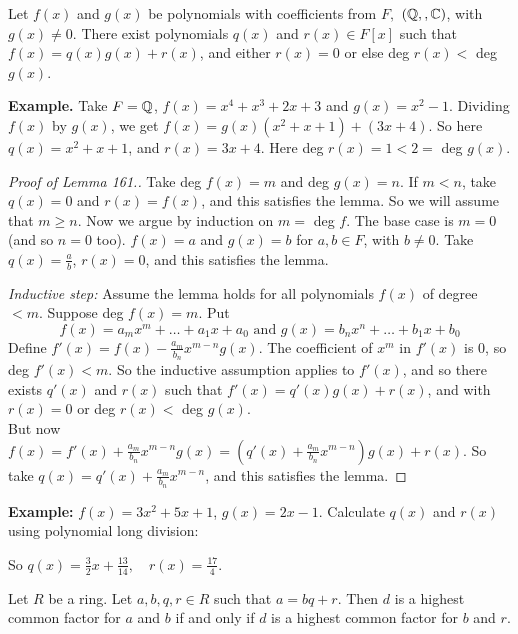 \documentclass[10pt]{scrartcl}
\begin{document}
\begin{lemma} Let $f(x)$ and $g(x)$ be polynomials with coefficients from $F,$ $(\mathbb{Q},,\mathbb{C})$, with $g(x) \neq 0$. There exist polynomials $q(x)$ and $r(x) \in F[x]$ such that $f(x) = q(x)g(x) + r(x)$, and either $r(x) =0$ or else deg $r(x) <$ deg $g(x)$. 	
\end{lemma}

 \textbf{Example.} Take $F = \mathbb{Q}$, $f(x) = x^4 + x^3 + 2x + 3$ and $g(x) = x^2 -1$. Dividing $f(x)$ by $g(x)$, we get $f(x) = g(x)(x^2 + x + 1) + (3x+4)$. So here $q(x) = x^2 + x + 1$, and $r(x) = 3x + 4$. Here deg $r(x) = 1 < 2 = $ deg $g(x)$.

\begin{proof}[Proof of Lemma 161.]
	Take deg $f(x) = m$ and deg $g(x) = n$. If $m < n$, take $q(x) =0$ and $r(x) = f(x)$, and this satisfies the lemma. So we will assume that $m \geq n$. Now we argue by induction on $m = $ deg $f$. The base case is $m = 0$ (and so $n = 0$ too). $f(x) = a$ and $g(x) = b$ for $a,b \in F$, with $b \neq 0$. Take $q(x) = \frac{a}{b}$, $r(x) = 0$, and this satisfies the lemma.
	
	\textit{Inductive step:} Assume the lemma holds for all polynomials $f(x)$ of degree $<m$. Suppose deg $f(x) = m$. Put \[f(x) = a_mx^m + \dots + a_1x + a_0 \text{ and } g(x) = b_nx^n + \dots + b_1x + b_0\] Define $f'(x) = f(x) - \frac{a_m}{b_n}x^{m-n}g(x)$. The coefficient of $x^m$ in $f'(x)$ is $0$, so deg $f'(x) < m$. So the inductive assumption applies to $f'(x)$, and so there exists $q'(x)$ and $r(x)$ such that $f'(x) = q'(x)g(x) + r(x)$, and with $r(x) = 0$ or deg $r(x) <$ deg $g(x)$.\vspace*{5pt}\\ But now $f(x) = f'(x) + \frac{a_m}{b_n}x^{m-n}g(x) = (q'(x) + \frac{a_m}{b_n}x^{m-n})g(x) + r(x).$ So take $q(x) = q'(x) + \frac{a_m}{b_n}x^{m-n}$, and this satisfies the lemma.
\end{proof}\vspace*{5pt}

 \textbf{Example:} $f(x) = 3x^2 + 5x + 1$, $g(x)= 2x -1$. Calculate $q(x)$ and $r(x)$ using polynomial long division:\\


So $q(x) = \frac{3}{2}x + \frac{13}{14}, \quad r(x) = \frac{17}{4}$. \\

\begin{proposition} Let $R$ be a ring. Let $a,b,q,r \in R$ such that $a = bq + r$. Then $d$ is a highest common factor for $a$ and $b$ if and only if $d$ is a highest common factor for $b$ and $r$.	
\end{proposition}
\end{document}
